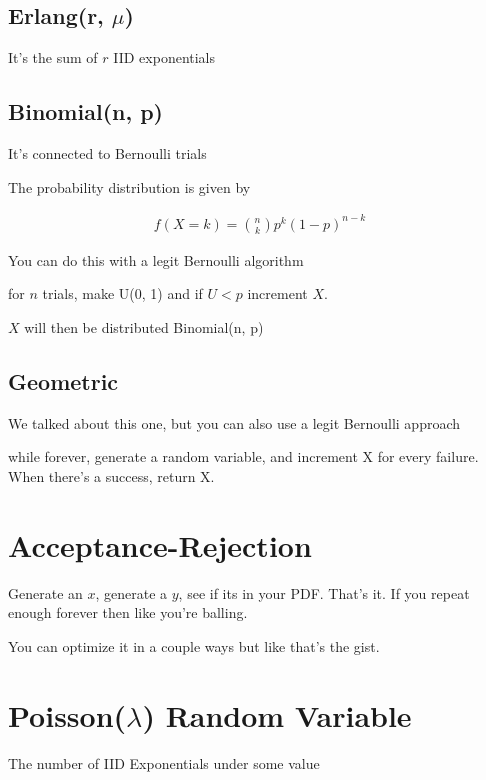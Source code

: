 \documentclass[fleqn]{report}
\newcommand{\equations} [1] {
\begin{gather*}
#1
\end{gather*}
}
\begin{document}
\subsection{Erlang(r, $\mu$)}
It's the sum of $r$ IID exponentials 

\subsection{Binomial(n, p)}
It's connected to Bernoulli trials 

The probability distribution is given by 
\equations{
    f(X = k)
    =
    {n \choose k } p^k (1 - p)^{n-k}
}

You can do this with a legit Bernoulli algorithm 

for $n$ trials, make U(0, 1) and if $U < p$ increment $X$.

$X$ will then be distributed Binomial(n, p)

\subsection{Geometric}
We talked about this one, but you can also use a legit Bernoulli approach 

while forever, generate a random variable, and increment X for every failure.
When there's a success, return X. 

\section{Acceptance-Rejection}
Generate an $x$, generate a $y$, see if its in your PDF. That's it. If you 
repeat enough forever then like you're balling.

You can optimize it in a couple ways but like that's the gist. 

\section{Poisson($\lambda$) Random Variable}
The number of IID Exponentials under some value 
\end{document}
